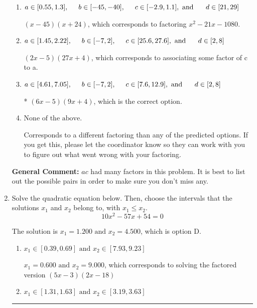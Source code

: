 \documentclass{extbook}[14pt]
\newcommand{\litem}[1]{\item #1

\rule{\textwidth}{0.4pt}}
\begin{document}
\begin{enumerate}
{\begin{enumerate}[label=\Alph*.]
 $(18x -5)(3x + 4)$, which corresponds to associating some factor of a to c.
\item \( a \in [0.55, 1.3], \hspace*{5mm} b \in [-45, -40], \hspace*{5mm} c \in [-2.9, 1.1], \text{ and } \hspace*{5mm} d \in [21, 29] \)

 $(x -45)(x + 24)$, which corresponds to factoring $x^{2} -21 x -1080$.
\item \( a \in [1.45, 2.22], \hspace*{5mm} b \in [-7, 2], \hspace*{5mm} c \in [25.6, 27.6], \text{ and } \hspace*{5mm} d \in [2, 8] \)

 $(2x -5)(27x + 4)$, which corresponds to associating some factor of c to a.
\item \( a \in [4.61, 7.05], \hspace*{5mm} b \in [-7, 2], \hspace*{5mm} c \in [7.6, 12.9], \text{ and } \hspace*{5mm} d \in [2, 8] \)

* $(6x -5)(9x + 4)$, which is the correct option.
\item \( \text{None of the above.} \)

 Corresponds to a different factoring than any of the predicted options. If you get this, please let the coordinator know so they can work with you to figure out what went wrong with your factoring.
\end{enumerate}

\textbf{General Comment:} $ac$ had many factors in this problem. It is best to list out the possible pairs in order to make sure you don't miss any.
}
\litem{
Solve the quadratic equation below. Then, choose the intervals that the solutions $x_1$ and $x_2$ belong to, with $x_1 \leq x_2$.
\[ 10x^{2} -57 x + 54 = 0 \]

The solution is \( x_1 = 1.200 \text{ and } x_2 = 4.500 \), which is option D.\begin{enumerate}[label=\Alph*.]
\item \( x_1 \in [0.39, 0.69] \text{ and } x_2 \in [7.93, 9.23] \)

$x_1 = 0.600 \text{ and } x_2 = 9.000$, which corresponds to solving the factored version $(5x -3)(2x -18)$
\item \( x_1 \in [1.31, 1.63] \text{ and } x_2 \in [3.19, 3.63] \)


\end{enumerate}}
\end{enumerate}
\end{document}
